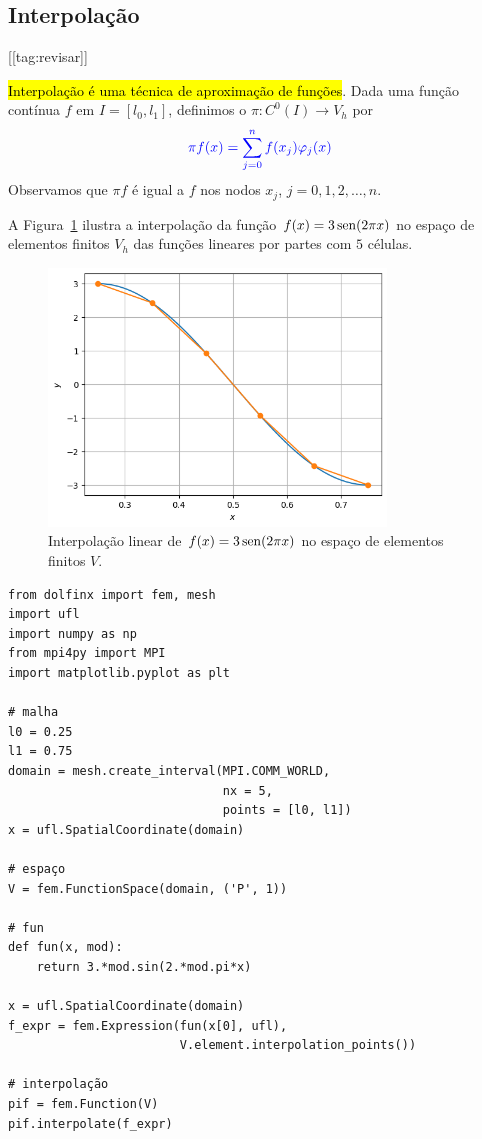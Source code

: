 \subsection{Interpolação}
[[tag:revisar]]

\hl{Interpolação é uma técnica de aproximação de funções}. Dada uma função contínua $f$ em $I=[l_0, l_1]$, definimos o  $\pi: C^0(I)\to V_h$ por
\begin{equation}\color{blue}\pi f (x) = \sum_{j=0}^{n}f(x_j)\varphi_j(x)
\end{equation}
Observamos que $\pi f$ é igual a $f$ nos nodos $x_j$, $j=0, 1, 2, \dotsc, n$. 

\begin{ex}\label{ex:mef1d_interp_lin}
  A Figura~\ref{fig:ex_mef1d_interp_lin} ilustra a interpolação da função $f(x)=3\operatorname{sen}(2\pi x)$ no espaço de elementos finitos $V_h$ das funções lineares por partes com $5$ células.

  \begin{figure}[H]
    \centering
    \includegraphics[width=0.8\textwidth]{./cap_mef1d/dados/ex_mef1d_interp_lin/fig}
    \caption{Interpolação linear de $f(x)=3\operatorname{sen}(2\pi x)$ no espaço de elementos finitos $V$.}
    \label{fig:ex_mef1d_interp_lin}
  \end{figure}


\begin{lstlisting}[caption=mef1d\_interp\_lin]
from dolfinx import fem, mesh
import ufl
import numpy as np
from mpi4py import MPI
import matplotlib.pyplot as plt

# malha
l0 = 0.25
l1 = 0.75
domain = mesh.create_interval(MPI.COMM_WORLD,
                              nx = 5,
                              points = [l0, l1])
x = ufl.SpatialCoordinate(domain)

# espaço
V = fem.FunctionSpace(domain, ('P', 1))

# fun
def fun(x, mod):
    return 3.*mod.sin(2.*mod.pi*x)

x = ufl.SpatialCoordinate(domain)
f_expr = fem.Expression(fun(x[0], ufl),
                        V.element.interpolation_points())

# interpolação
pif = fem.Function(V)
pif.interpolate(f_expr)
\end{lstlisting}
\end{ex}


